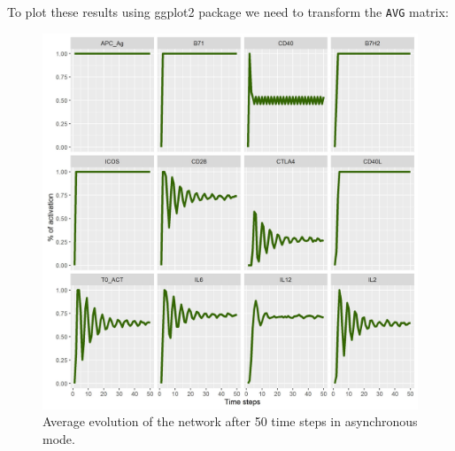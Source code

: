\documentclass[a4paper]{article}
\begin{document}
To plot these results using ggplot2 package we need to transform the \texttt{AVG} matrix:
\begin{Schunk}
\end{Schunk}
\begin{figure}[!htbp]
\centerline{\includegraphics{Average.jpg}}
\caption{Average evolution of the network after 50 time steps in asynchronous mode.}\label{fig:Average}
\end{figure}
\end{document}
